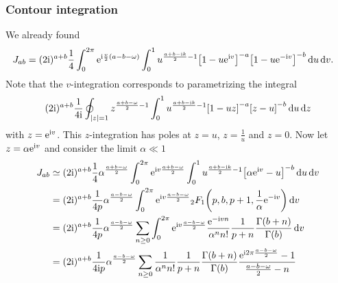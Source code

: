 \documentclass[english, parskip=full]{scrartcl}
\begin{document}
\subsubsection{Contour integration}
We already found
\begin{align}
J_{ab} &= (2\i)^{a+b} \frac{1}{4} \intx{0}{2\pi}{ \powe{\i \frac{v}{2} (a -b - \omega)} \intx{0}{1}{u^{\frac{a+b - \i k}{2} - 1} \klb*{1 - u \powe{\i v}}^{-a} \klb*{1 - u \powe{-\i v}}^{-b} }{u} }{v}.
\end{align}
Note that the $v$-integration corresponds to parametrizing the integral
\begin{align}
(2\i)^{a+b} \frac{1}{4\i} \oint_{|z|=1} z^{\frac{a+b-\omega}{2}-1} \intx{0}{1}{u^{\frac{a+b - \i k}{2} - 1} \klb*{1 - u z}^{-a} \klb*{z - u}^{-b} }{u} \,\d z
\end{align}
with $z=\text{e}^{\text{i} v}$.
This $z$-integration has poles at $z=u$, $z=\frac{1}{u}$ and $z=0$.
Now let $z=\alpha\text{e}^{\text{i} v}$ and consider the limit $\alpha\ll 1$
\begin{align}
J_{ab} &\simeq (2\i)^{a+b} \frac{1}{4} \alpha^\frac{a+b-\omega}{2} \intx{0}{2\pi}{ \powe{\i v \frac{a+b-\omega}{2}} \intx{0}{1}{u^{\frac{a+b - \i k}{2} - 1} \klb*{\alpha\powe{\i v} - u}^{-b} }{u} }{v} \\
&= (2\i)^{a+b} \frac{1}{4p} \alpha^\frac{a-b-\omega}{2} \intx{0}{2\pi}{\powe{\i v\frac{a-b-\omega}{2}} {}_2F_1\kla*{p, b, p + 1, \frac{1}{\alpha} \powe{-\i v}} }{v}\\
&= (2\i)^{a+b} \frac{1}{4p} \alpha^\frac{a-b-\omega}{2} \sum_{n\ge 0} \intx{0}{2\pi}{\powe{\i v\frac{a-b-\omega}{2}} \frac{\powe{-\i vn}}{\alpha^n n!} \frac{1}{p+n} \frac{\Gamma(b+n)}{\Gamma(b)} }{v}\\
&= (2\i)^{a+b} \frac{1}{4\i p} \alpha^\frac{a-b-\omega}{2} \sum_{n\ge 0} \frac{1}{\alpha^n n!} \frac{1}{p+n} \frac{\Gamma(b+n)}{\Gamma(b)} \frac{\powe{\i 2\pi \frac{a-b-\omega}{2}} - 1}{\frac{a-b-\omega}{2} - n}
\end{align}
\end{document}
